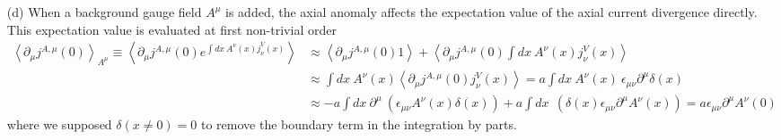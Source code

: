 \documentclass[10pt, a4paper]{article}
\begin{document}
{\begin{enumerate}
\begin{align*}
       &\implies 
       e^{-i p_1 \cdot x} p_1^\mu \langle j^A_\mu (p_1) j^V_\nu (-p_1) \rangle = i \partial^\mu_1 \langle \int \text{d}x_1 \ e^{- i p_1 \cdot x_1} j_{\mu}^{A}(x_1)  j_{\nu}^{V}(x) \rangle, \quad \text{$\longrightarrow$ change of variables $p_1= - p$}\\
    &\implies -\frac{1}{(2\pi)^2}\int \text{d}p \ e^{i p \cdot x}  p^\mu \langle j^A_\mu (-p) j^V_\nu (p) \rangle = \frac{i}{(2\pi)^2} \partial^\mu_1 \langle \int \text{d}p \int \text{d}x_1 \ e^{+ i p \cdot x_1} j_{\mu}^{A}(x_1)  j_{\nu}^{V}(x) \rangle = i\partial^\mu_1 \langle j_{\mu}^{A}(0)  j_{\nu}^{V}(x) \rangle 
  \end{align*}
  and 
  \begin{align*}
    - \frac{1}{(2\pi)^2}\int \text{d}p\ e^{i p \cdot x} a\epsilon_{\mu\nu} p^\mu = a\ i\ \epsilon_{\mu\nu} \partial^\mu_1 \delta(x) \implies  \langle \partial^\mu_1 j_{\mu}^{A}(0)  j_{\nu}^{V}(x) \rangle  = a\ \epsilon_{\mu\nu} \partial^\mu_1 \delta(x)  
  \end{align*}
  which shows that the divergence of the axial current has a non-vanishing correlator (can't be explained by contact terms since they would vanish through $\delta j_\nu(x) = 0$) with the vector current contradicting the Ward identity for the axial current. 
  
  \item[(d)] When a background gauge field $A^{\mu}$ is added, the axial anomaly affects the expectation value of the axial current divergence directly. This expectation value is evaluated at first non-trivial order 
  \begin{align*}
    \left\langle\partial_\mu j^{A, \mu}(0)\right\rangle_{A^\mu} \equiv\left\langle\partial_\mu j^{A, \mu}(0) e^{\int d x \ A^\nu (x) j_\nu^V (x)}\right\rangle &\approx \left\langle\partial_\mu j^{A, \mu}(0) 1\right\rangle  +   \left\langle\partial_\mu j^{A, \mu}(0) \int d x\  A^\nu(x) j_\nu^V(x)\right\rangle \\
    &\approx \int d x \ A^\nu(x) \left\langle\partial_\mu j^{A, \mu}(0)  j_\nu^V (x)\right\rangle = a\int d x \ A^\nu(x) \ \epsilon_{\mu\nu} \partial^\mu \delta(x)\\
    &\approx -a\int d x \  \partial^\mu \ (\epsilon_{\mu\nu} A^\nu(x)\delta(x)) + a \int d x \   \ (\delta(x) \epsilon_{\mu\nu} \partial^\mu A^\nu(x)) = a \epsilon_{\mu\nu} \partial^\mu A^\nu(0)
  \end{align*}
  where we supposed $\delta(x\neq 0) = 0$ to remove the boundary term in the integration by parts. 
\end{enumerate}

}
\end{document}

